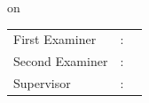 \begin{titlepage}
{    \begin{center}
      \large \spacedallcaps{\myName}
    \end{center}

    \begin{center}
      \large on \myTime{} \\
    \end{center}
    \vfill

    \begin{center}
      \begin{tabular}{lll}
        First Examiner  & : & \myProf{}       \\ %
        Second Examiner & : & \myOtherProf{}  \\ %
        Supervisor      & : & \mySupervisor{} %
      \end{tabular}
    \end{center}

  }  %



  \changetext{}{-21mm}{}{-19mm}{}

\end{titlepage}
